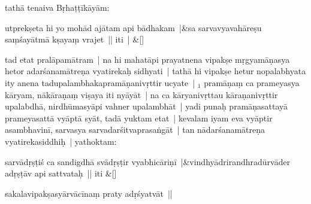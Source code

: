 \documentclass[article,12pt,a4paper]{memoir}%
\newcounter{parCount}
\begin{document}
	  
	  
	    \pstart  \leavevmode%
	    \hphantom{.}
	{}
	\pend%
      

	  \pstart \leavevmode%
	\label{thakur75-42.21}tathā tenaiva Bṛhaṭṭīkāyām:
	{}
	\pend%
      
	    
	    \stanza[\smallbreak]
	  utprekṣeta hi yo mohād ajātam api bādhakam |&sa sarvavyavahāreṣu saṃśayātmā kṣayaṃ vrajet || iti | \&[\smallbreak]
	  
	  
	  

	  \pstart \leavevmode%
	tad etat pralāpamātram | na hi mahatāpi prayatnena vipakṣe mṛgyamāṇasya hetor adarśanamātreṇa vyatirekaḥ sidhyati | tathā hi vipakṣe hetur nopalabhyata ity anena tadupalambhakapramāṇanivṛttir ucyate | {\tiny $_{1}$} pramāṇaṃ ca prameyasya kāryam, nākāraṇaṃ viṣaya iti nyāyāt | na ca kāryanivṛttau kāraṇanivṛttir upalabdhā, nirdhūmasyāpi vahner upalambhāt | yadi punaḥ pramāṇasattayā prameyasattā vyāptā syāt, tadā yuktam etat | kevalam iyam eva vyāptir asambhavinī, sarvasya sarvadarśitvaprasaṅgāt | tan nādarśanamātreṇa vyatirekasiddhiḥ | yathoktam: 
	    \pend%
	  
	    
	    \stanza[\smallbreak]
	  sarvādṛṣṭiś ca sandigdhā svādṛṣṭir vyabhicāriṇī |&vindhyādrirandhradūrvāder adṛṣṭāv api sattvataḥ || iti \&[\smallbreak]
	  
	  
	  
	    \pstart  \leavevmode%
	    \hphantom{.}
	   sakalavipakṣasyārvācīnaṃ praty adṛśyatvāt ||
	{}
	\pend%
      
\end{document}
